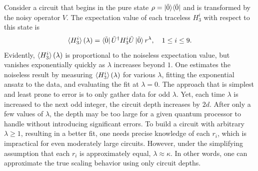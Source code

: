 \documentclass[aps,10pt,superscriptaddress,floatfix,nofootinbib,notitlepage]{revtex4-1}
\begin{document}
Consider a circuit that begins in the pure state $\rho=\ket{\tilde{0}}\!\bra{\tilde{0}}$ and is transformed by the noisy operator $V$. The expectation value of each traceless $H_3^i$ with respect to this state is
\begin{equation}\label{eq:GDscaling}
    \braket{H_3^i}(\lambda)
    =\bra{\tilde{0}}
    \tilde{U}^\dag H_3^i\tilde{U}
    \ket{\tilde{0}}
    r^\lambda,
    \quad
    1\leq i\leq9.
\end{equation}
Evidently, $\braket{H_3^i}(\lambda)$ is proportional to the noiseless expectation value, but vanishes exponentially quickly as $\lambda$ increases beyond $1$. One estimates the noiseless result by measuring $\braket{H_3^i}(\lambda)$ for various $\lambda$, fitting the exponential ansatz to the data, and evaluating the fit at $\lambda=0$. The approach that is simplest and least prone to error is to only gather data for odd $\lambda$. Yet, each time $\lambda$ is increased to the next odd integer, the circuit depth increases by $2d$. After only a few values of $\lambda$, the depth may be too large for a given quantum processor to handle without introducing significant errors. To build a circuit with arbitrary $\lambda\geq1$, resulting in a better fit, one needs precise knowledge of each $r_i$, which is impractical for even moderately large circuits. However, under the simplifying assumption that each $r_i$ is approximately equal, $\lambda\approx\kappa$. In other words, one can approximate the true scaling behavior using only circuit depths.
 
 
 
\end{document}
